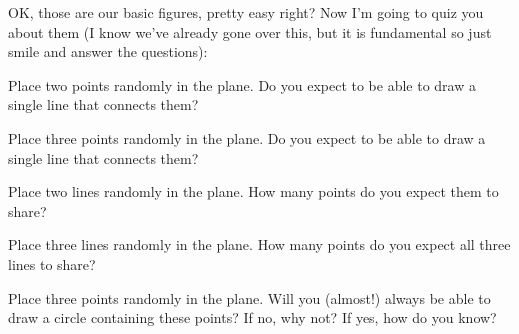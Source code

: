 OK, those are our basic figures, pretty easy right? Now I'm going to
quiz you about them (I know we've already gone over this, but it is
fundamental so just smile and answer the questions):

\begin{question} 
Place two points randomly in the plane. Do you expect to be able to
draw a single line that connects them?
\end{question}
\QM

\begin{question} 
Place three points randomly in the plane. Do you expect to be able to
draw a single line that connects them?
\end{question}
\QM

\begin{question} 
Place two lines randomly in the plane. How many points do you expect
them to share?
\end{question}
\QM


\begin{question} 
Place three lines randomly in the plane. How many points do you expect
all three lines to share?
\end{question}
\QM


\begin{question} 
Place three points randomly in the plane. Will you (almost!) always be
able to draw a circle containing these points? If no, why not? If yes,
how do you know?
\end{question}
\QM


%
%
%
%
%



